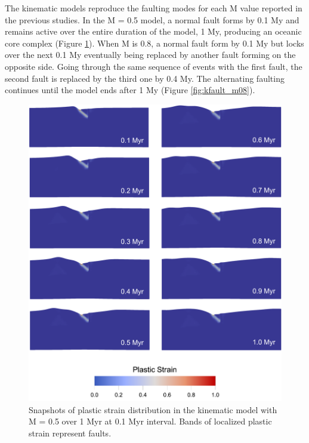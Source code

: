 \documentclass[letterpaper,12pt,notitle]{memphisthesis}                     %
\begin{document}
The kinematic models reproduce the faulting modes for each M value reported in the previous studies. In the M = 0.5 model, a normal fault forms by 0.1 My and remains active over the entire duration of the model, 1 My, producing an oceanic core complex (Figure \ref{fig:kfault_m05}). When M is 0.8, a normal fault form by 0.1 My but locks over the next 0.1 My eventually being replaced by another fault forming on the opposite side. Going through the same sequence of events with the first fault, the second fault is replaced by the third one by 0.4 My. The alternating faulting continues until the model ends after 1 My (Figure \ref{fig:kfault_m08}).
%
\begin{figure}[!htb]
	\centering
	\includegraphics[width=0.9\linewidth]{./figs/kfault_m05.png}
	\caption{Snapshots of plastic strain distribution in the kinematic model with M = 0.5 over 1 Myr at 0.1 Myr interval. Bands of localized plastic strain represent faults.}
	\label{fig:kfault_m05}
\end{figure}
\end{document}
